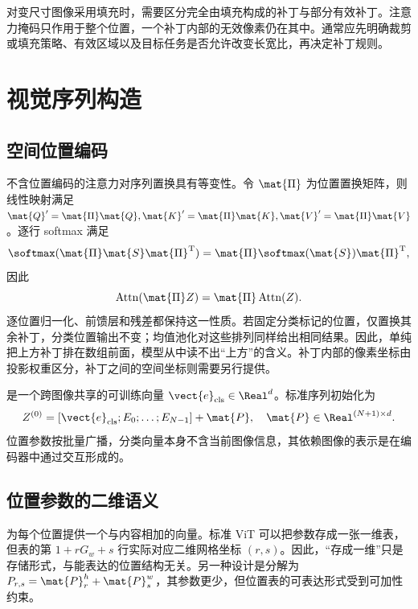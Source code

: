 \documentclass[../textbook.tex]{subfiles}
\begin{document}
对变尺寸图像采用填充时，需要区分完全由填充构成的补丁与部分有效补丁。注意力掩码只作用于整个位置，一个补丁内部的无效像素仍在其中。通常应先明确裁剪或填充策略、有效区域以及目标任务是否允许改变长宽比，再决定补丁规则。

\section{视觉序列构造}

\subsection{空间位置编码}
不含位置编码的注意力对序列置换具有等变性。令 $\mat{\Pi}$ 为位置置换矩阵，则线性映射满足 $\mat{Q}'=\mat{\Pi} \mat{Q},\mat{K}'=\mat{\Pi} \mat{K},\mat{V}'=\mat{\Pi} \mat{V}$。逐行 softmax 满足
\begin{equation}
 \softmax(\mat{\Pi} \mat{S}\mat{\Pi}^{\mathrm{T}})=\mat{\Pi}\softmax(\mat{S})\mat{\Pi}^{\mathrm{T}},
\end{equation}
因此
\begin{equation}
 \operatorname{Attn}(\mat{\Pi} Z)=\mat{\Pi}\operatorname{Attn}(Z).
 \label{eq:vit-equivariance}
\end{equation}
逐位置归一化、前馈层和残差都保持这一性质。若固定分类标记的位置，仅置换其余补丁，分类位置输出不变；均值池化对这些排列同样给出相同结果。因此，单纯把上方补丁排在数组前面，模型从中读不出“上方”的含义。补丁内部的像素坐标由投影权重区分，补丁之间的空间坐标则需要另行提供。

是一个跨图像共享的可训练向量 $\vect{e}_{\mathrm{cls}}\in\Real^d$。标准序列初始化为
\begin{equation}
 Z^{(0)}=[\vect{e}_{\mathrm{cls}};E_0;\ldots;E_{N-1}]+\mat{P},
 \quad \mat{P}\in\Real^{(N+1)\times d}.
 \label{eq:vit-sequence}
\end{equation}
位置参数按批量广播，分类向量本身不含当前图像信息，其依赖图像的表示是在编码器中通过交互形成的。

\subsection{位置参数的二维语义}
为每个位置提供一个与内容相加的向量。标准 ViT 可以把参数存成一张一维表，但表的第 $1+rG_w+s$ 行实际对应二维网格坐标 $(r,s)$。因此，“存成一维”只是存储形式，与能表达的位置结构无关。另一种设计是分解为 $P_{r,s}=\mat{P}^h_r+\mat{P}^w_s$，其参数更少，但位置表的可表达形式受到可加性约束。
\end{document}

